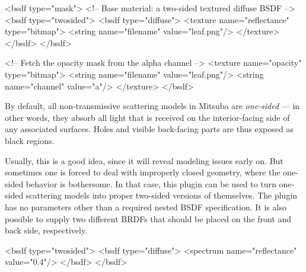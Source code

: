 \begin{xml}[caption=Material configuration for a transparent leaf,
   label=lst:mask-leaf]
<bsdf type="mask">
    <!-- Base material: a two-sided textured diffuse BSDF -->
    <bsdf type="twosided">
        <bsdf type="diffuse">
            <texture name="reflectance" type="bitmap">
                <string name="filename" value="leaf.png"/>
            </texture>
        </bsdf>
    </bsdf>

    <!-- Fetch the opacity mask from the alpha channel -->
    <texture name="opacity" type="bitmap">
        <string name="filename" value="leaf.png"/>
        <string name="channel" value="a"/>
    </texture>
</bsdf>
\end{xml}


By default, all non-transmissive scattering models in Mitsuba
are \emph{one-sided} --- in other words, they absorb all light
that is received on the interior-facing side of any associated
surfaces. Holes and visible back-facing parts are thus exposed
as black regions.

Usually, this is a good idea, since it will reveal modeling
issues early on. But sometimes one is forced to deal with
improperly closed geometry, where the one-sided behavior is
bothersome. In that case, this plugin can be used to turn
one-sided scattering models into proper two-sided versions of
themselves. The plugin has no parameters other than a required
nested BSDF specification. It is also possible to supply two
different BRDFs that should be placed on the front and back
side, respectively.
\vspace{4mm}

\begin{xml}[caption=A two-sided diffuse material]
<bsdf type="twosided">
    <bsdf type="diffuse">
         <spectrum name="reflectance" value="0.4"/>
    </bsdf>
</bsdf>
\end{xml}

